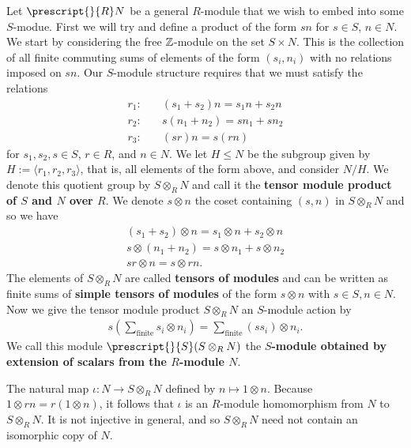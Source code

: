 \documentclass{memoir}
\begin{document}
\begin{defn}
	Let \(\prescript{}{R}N\) be a general \(R\)-module that we wish to embed into some \(S\)-modue. First we will try and define a product of the form \(sn\) for \(s \in S\), \(n \in N\).\\

	We start by considering the free \(\mathbb{Z}\)-module on the set \(S\times N\). This is the collection of all finite commuting sums of elements of the form \((s_i,n_i)\) with no relations imposed on \(sn\). Our \(S\)-module structure requires that we must satisfy the relations
	\begin{align*}
		r_1:& \quad(s_1+s_2)n = s_1n + s_2n \\
		r_2:& \quad s(n_1+n_2) = sn_1 + sn_2\\
		r_3:& \quad (sr)n = s(rn)
	\end{align*}
	for \(s_1,s_2,s \in S\), \(r \in R\), and \(n \in N\). We let \(H\leq N\) be the subgroup given by \(H := \langle r_1,r_2,r_3 \rangle \), that is, all elements of the form above, and consider \(N / H\). We denote this quotient group by \(S \otimes_R N\) and call it the \textbf{tensor module product of \(S\) and \(N\) over \(R\)}. We denote \(s \otimes n\) the coset containing \((s,n)\) in \(S \otimes_R N\) and so we have
	\begin{align*}
		(s_1+s_2) \otimes n = s_1\otimes n + s_2 \otimes n\\
		s \otimes (n_1+n_2) = s\otimes n_1 + s \otimes n_2\\
		sr \otimes n = s \otimes rn.
	\end{align*}
	The elements of \(S \otimes_R N\) are called \textbf{tensors of modules} and can be written as finite sums of \textbf{simple tensors of modules} of the form \(s \otimes n\) with \(s \in S, n \in N\).\\

	Now we give the tensor module product \(S \otimes_R N\) an \(S\)-module action by
	\begin{align*}
		s\left( \sum_{\textrm{finite}} s_i \otimes n_i \right) = \sum_{\textrm{finite}} (ss_i) \otimes n_i.
	\end{align*}
	We call this module \(\prescript{}{S}(S \otimes_R N)\) the \textbf{\(S\)-module obtained by extension of scalars from the \(R\)-module \(N\)}.
\end{defn}
The natural map \(\iota: N \to S \otimes_R N\) defined by \(n\mapsto 1 \otimes n\). Because \(1 \otimes rn = r(1 \otimes n)\), it follows that \(\iota\) is an \(R\)-module homomorphism from \(N\) to \(S \otimes_R N\). It is not injective in general, and so \(S \otimes_R N\) need not contain an isomorphic copy of \(N\).\\
\end{document}
